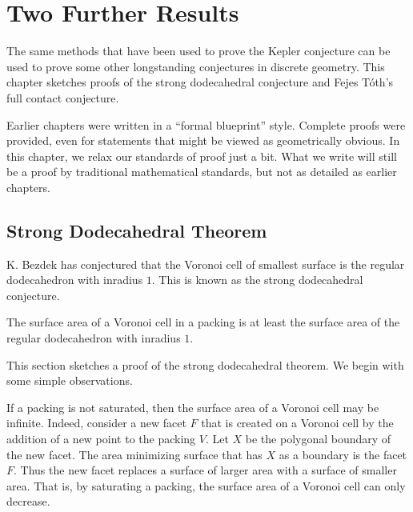 
\chapter{Two Further Results}


The same methods that have been used to prove the Kepler conjecture can
be used to prove some other longstanding conjectures in discrete geometry.
This chapter sketches proofs of the strong dodecahedral conjecture and Fejes T\'oth's
full contact conjecture.

Earlier chapters were written in a ``formal blueprint'' style.   Complete proofs
were provided, even for statements that might be viewed as geometrically obvious.  In
this chapter, we relax our standards of proof just a bit.  What we write will still be a
proof by traditional mathematical standards, but not as detailed as earlier chapters.

\section{Strong Dodecahedral Theorem}

K. Bezdek has conjectured that the Voronoi cell of smallest surface is
the regular dodecahedron with inradius $1$.  This is known as the
strong dodecahedral conjecture.  %
%


\begin{theorem}
  The surface area of a Voronoi cell in a packing is at least the
  surface area of the regular dodecahedron with inradius $1$.
\end{theorem}

This section sketches a proof of the strong dodecahedral theorem.  We
begin with some simple observations.

\begin{remark}
  If a packing is not saturated, then the surface area of a Voronoi
  cell may be infinite.  
  Indeed, consider a new facet $F$ that is created on a Voronoi cell
  by the addition of a new point to the packing $V$.  Let $X$ be the
  polygonal boundary of the new facet.  The area minimizing surface
  that has $X$ as a boundary is the facet $F$.  Thus the new facet
  replaces a surface of larger area with a surface of smaller area.
  That is, by saturating a packing, the surface area of a Voronoi cell
  can only decrease.
\end{remark}


